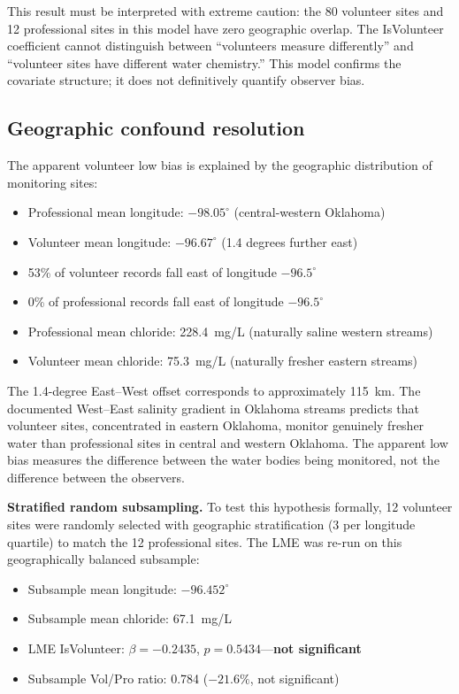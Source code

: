 \documentclass[lineno]{wlpeerj}
\begin{document}
This result must be interpreted with extreme caution: the 80 volunteer sites and 12 professional sites in this model have zero geographic overlap. The IsVolunteer coefficient cannot distinguish between ``volunteers measure differently'' and ``volunteer sites have different water chemistry.'' This model confirms the covariate structure; it does not definitively quantify observer bias.

\subsection{Geographic confound resolution}
\label{sec:confound}

The apparent volunteer low bias is explained by the geographic distribution of monitoring sites:

\begin{itemize}
  \item Professional mean longitude: $-98.05^{\circ}$ (central-western Oklahoma)
  \item Volunteer mean longitude: $-96.67^{\circ}$ (1.4 degrees further east)
  \item 53\% of volunteer records fall east of longitude $-96.5^{\circ}$
  \item 0\% of professional records fall east of longitude $-96.5^{\circ}$
  \item Professional mean chloride: 228.4~mg/L (naturally saline western streams)
  \item Volunteer mean chloride: 75.3~mg/L (naturally fresher eastern streams)
\end{itemize}

The 1.4-degree East--West offset corresponds to approximately 115~km. The documented West--East salinity gradient in Oklahoma streams \citep{Dyer2025} predicts that volunteer sites, concentrated in eastern Oklahoma, monitor genuinely fresher water than professional sites in central and western Oklahoma. The apparent low bias measures the difference between the water bodies being monitored, not the difference between the observers.

\textbf{Stratified random subsampling.} To test this hypothesis formally, 12 volunteer sites were randomly selected with geographic stratification (3 per longitude quartile) to match the 12 professional sites. The LME was re-run on this geographically balanced subsample:

\begin{itemize}
  \item Subsample mean longitude: $-96.452^{\circ}$
  \item Subsample mean chloride: 67.1~mg/L
  \item LME IsVolunteer: $\beta = -0.2435$, $p = 0.5434$---\textbf{not significant}
  \item Subsample Vol/Pro ratio: 0.784 ($-21.6\%$, not significant)
\end{itemize}
\end{document}
